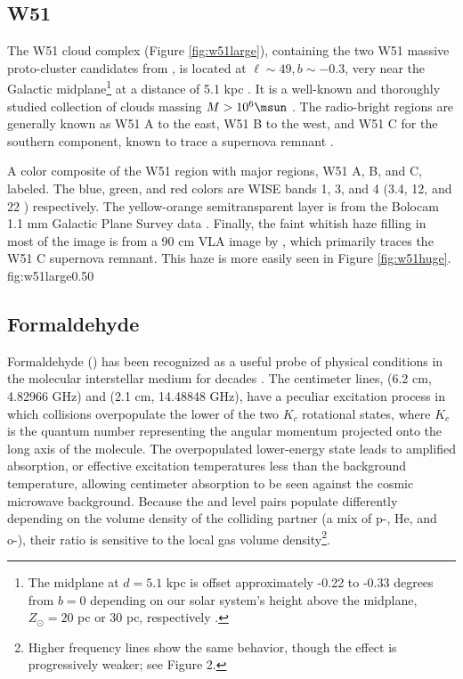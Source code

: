 \subsection{W51}
The W51 cloud complex (Figure \ref{fig:w51large}), containing the two W51
massive proto-cluster candidates from \citet{Ginsburg2012a}, is located at
$\ell\sim49, b\sim-0.3$, very near the Galactic midplane\footnote{The midplane
at $d=5.1$ kpc is offset approximately -0.22 to -0.33 degrees from $b=0$
depending on our solar system's height above the midplane, $Z_\odot = 20$ pc or
30 pc, respectively \citep{Reed2006a,Joshi2007a}.} at a distance of 5.1 kpc
\citep{Sato2010a}.  It is a well-known and thoroughly studied collection of
clouds massing $M>10^6 \msun$
\citep{Carpenter1998a,Bieging2010a,Kang2010a,Parsons2012a}.  The radio-bright
regions are generally known as W51 A to the east, W51 B to the west, and W51 C
for the southern component, known to trace a supernova remnant
\citep{Koo1995a,Brogan2000a,Brogan2013a}.

{A color composite of the W51 region with major regions, W51 A, B, and C,
labeled.  The blue, green, and red colors are WISE bands 1, 3, and 4 (3.4, 12,
and 22 \um) respectively.  The yellow-orange semitransparent layer is from the
Bolocam 1.1 mm Galactic Plane Survey data \citep{Aguirre2011a,Ginsburg2013a}.
Finally, the faint whitish haze filling in most of the image is from a 90 cm
VLA image by \citet{Brogan2013a}, which primarily traces the W51 C supernova
remnant.  This haze is more easily seen in Figure \ref{fig:w51huge}.}
{fig:w51large}{0.5}{0}


\subsection{Formaldehyde}
Formaldehyde (\formaldehyde) has been recognized as a useful probe of physical
conditions in the molecular interstellar medium for decades
\citep{Mangum1993a}.  The centimeter lines, \formaldehyde \oneone (6.2 cm,
4.82966 GHz) and \twotwo (2.1 cm, 14.48848 GHz), have a peculiar excitation
process in which collisions overpopulate the lower of the two $K_c$ rotational
states, where $K_c$ is the quantum number representing the angular momentum
projected onto the long axis of the molecule.  
The overpopulated lower-energy state leads to amplified absorption, or
effective excitation temperatures less than the background temperature,
allowing \formaldehyde centimeter absorption to be seen against the cosmic
microwave background.
Because the \oneone and \twotwo
level pairs populate differently
depending on the volume density of the colliding partner (a mix of p-\hh, He,
and o-\hh), their ratio is sensitive to the local gas volume
density\footnote{Higher frequency
\formaldehyde lines show the same behavior, though the effect is progressively
weaker; see \citet{Darling2012b} Figure 2.}.

